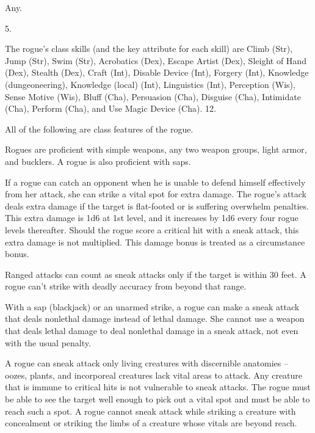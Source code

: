  Any.

 5.

The rogue's class skills (and the key attribute for each skill) are
Climb (Str), Jump (Str), Swim (Str), Acrobatics (Dex), Escape Artist (Dex),  Sleight of Hand (Dex), Stealth (Dex), Craft (Int), Disable Device (Int), Forgery (Int), Knowledge (dungeoneering), Knowledge (local) (Int), Linguistics (Int), Perception (Wis), Sense Motive (Wis), Bluff (Cha), Persuasion (Cha), Disguise (Cha), Intimidate (Cha), Perform (Cha), and Use Magic Device (Cha).
 12.

All of the following are class features of the rogue.

 Rogues are proficient with simple weapons,  any two weapon groups,  light armor,  and bucklers. A rogue is also proficient with saps.

  If a rogue can catch an opponent when he is unable to defend himself effectively from her attack, she can strike a vital spot for extra damage. The rogue's attack deals extra damage if the target is flat-footed or is suffering overwhelm penalties.  This extra damage is 1d6 at 1st level, and it increases by 1d6 every four rogue levels thereafter. Should the rogue score a critical hit with a sneak attack, this extra damage is not multiplied. This damage bonus is treated as a circumstance bonus.

\par Ranged attacks can count as sneak attacks only if the target is within 30 feet. A rogue can't strike with deadly accuracy from beyond that range.

With a sap (blackjack) or an unarmed strike, a rogue can make a sneak attack that deals nonlethal damage instead of lethal damage. She cannot use a weapon that deals lethal damage to deal nonlethal damage in a sneak attack, not even with the usual  penalty.

A rogue can sneak attack only living creatures with discernible anatomies -- oozes, plants, and incorporeal creatures lack vital areas to attack. Any creature that is immune to critical hits is not vulnerable to sneak attacks. The rogue must be able to see the target well enough to pick out a vital spot and must be able to reach such a spot. A rogue cannot sneak attack while striking a creature with concealment or striking the limbs of a creature whose vitals are beyond reach.

